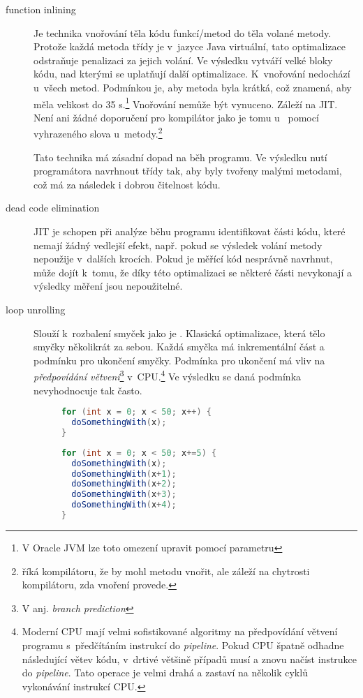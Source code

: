 \begin{description}
\item[function inlining] Je technika vnořování těla kódu funkcí/metod do těla volané metody. Protože každá metoda třídy je v~jazyce Java virtuální, tato optimalizace odstraňuje penalizaci za jejich volání. Ve výsledku vytváří velké bloky kódu, nad kterými se uplatňují další optimalizace. K~vnořování nedochází u~všech metod. Podmínkou je, aby metoda byla krátká, což znamená, aby měla velikost do 35 \bytecode s.\footnote{V Oracle JVM lze toto omezení upravit pomocí parametru } Vnořování nemůže být vynuceno. Záleží na JIT. Není ani žádné doporučení pro kompilátor jako je tomu u~\CC{} pomocí vyhrazeného slova  u~metody.\footnote{ říká kompilátoru, že by mohl metodu vnořit, ale záleží na chytrosti kompilátoru, zda vnoření provede\cite{Stroustrup:1997:CPL:523265}.}

Tato technika má zásadní dopad na běh programu. Ve výsledku nutí programátora navrhnout třídy tak, aby byly tvořeny malými metodami, což má za následek i dobrou čitelnost kódu.

\item[dead code elimination] JIT je schopen při analýze běhu programu identifikovat části kódu, které nemají žádný vedlejší efekt, např. pokud se výsledek volání metody nepoužije v~dalších krocích.
Pokud je měřící kód nesprávně navrhnut, může dojít k~tomu, že díky této optimalizaci se některé části nevykonají a výsledky měření jsou nepoužitelné.

\item[loop unrolling] Slouží k~rozbalení smyček jako je .
Klasická optimalizace, která tělo smyčky  několikrát za sebou. Každá smyčka má inkrementální část a podmínku pro ukončení smyčky.
Podmínka pro ukončení má vliv na \emph{předpovídání větvení}\footnote{V anj. \emph{branch prediction}} v~CPU.\footnote{Moderní CPU mají velmi sofistikované algoritmy na předpovídání větvení programu s~předčítáním instrukcí do \emph{pipeline}.
Pokud CPU špatně odhadne následující větev kódu, v~drtivé většině případů musí  a znovu načíst instrukce do \emph{pipeline}.
Tato operace je velmi drahá a zastaví na několik cyklů vykonávání instrukcí CPU.}
Ve výsledku se daná podmínka nevyhodnocuje tak často.

\begin{figure}
\begin{lstlisting}[frame=single,language=Java,caption=Před loop unrolling]
for (int x = 0; x < 50; x++) {
  doSomethingWith(x);
}
\end{lstlisting}
\begin{lstlisting}[frame=single,language=Java,caption=Po loop unrolling]
for (int x = 0; x < 50; x+=5) {
  doSomethingWith(x);
  doSomethingWith(x+1);
  doSomethingWith(x+2);
  doSomethingWith(x+3);
  doSomethingWith(x+4);
}
\end{lstlisting}
\end{figure}
\end{description}

